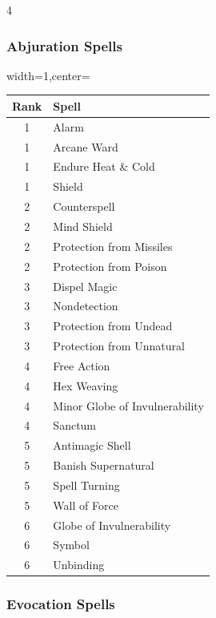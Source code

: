 \documentclass{book}
\begin{document}
\begin{multicols}{4}
	
\subsubsection*{Abjuration Spells}\label{abjuration-spells}
\begin{table}[H]
	\begin{adjustbox}{width=1\columnwidth,center=\columnwidth}
		\begin{tabular}{cl}
			\toprule\noalign{}
				Rank & Spell \\
			\midrule\noalign{}
				1 & Alarm \\
				1 & Arcane Ward \\
				1 & Endure Heat \& Cold \\
				1 & Shield \\
				2 & Counterspell \\
				2 & Mind Shield \\
				2 & Protection from Missiles \\
				2 & Protection from Poison \\
				3 & Dispel Magic \\
				3 & Nondetection \\
				3 & Protection from Undead \\
				3 & Protection from Unnatural \\
				4 & Free Action \\
				4 & Hex Weaving \\
				4 & Minor Globe of Invulnerability \\
				4 & Sanctum \\
				5 & Antimagic Shell \\
				5 & Banish Supernatural \\
				5 & Spell Turning \\
				5 & Wall of Force \\
				6 & Globe of Invulnerability \\
				6 & Symbol \\
				6 & Unbinding \\
			\bottomrule
		\end{tabular}
	\end{adjustbox}
\end{table}
	
\vfill

\subsubsection*{Evocation Spells}\label{evocation-spells}


\end{multicols}
\end{document}
